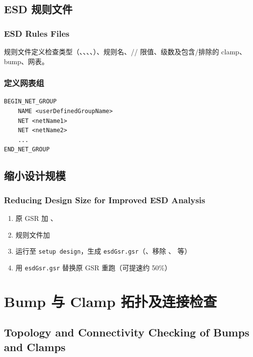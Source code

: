 \subsection{ESD 规则文件}
\subsubsection*{ESD Rules Files}

规则文件定义检查类型（、、、、）、规则名、// 限值、级数及包含/排除的 clamp、bump、网表。

\subsubsection{定义网表组}
\begin{lstlisting}
BEGIN_NET_GROUP
    NAME <userDefinedGroupName>
    NET <netName1>
    NET <netName2>
    ...
END_NET_GROUP
\end{lstlisting}

\subsection{缩小设计规模}
\subsubsection*{Reducing Design Size for Improved ESD Analysis}

\begin{enumerate}
  \item 原 GSR 加 、
  \item 规则文件加 
  \item 运行至 \texttt{setup design}，生成 \texttt{esdGsr.gsr}（、移除 、 等）
  \item 用 \texttt{esdGsr.gsr} 替换原 GSR 重跑（可提速约 50\%）
\end{enumerate}

\section{Bump 与 Clamp 拓扑及连接检查}
\subsection*{Topology and Connectivity Checking of Bumps and Clamps}

